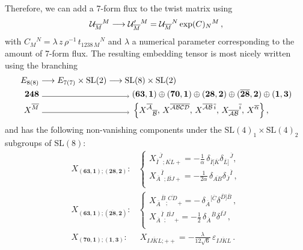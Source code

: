 \documentclass[a4paper, 11pt]{article}
\numberwithin{equation}{section}
\newcommand{\ov}[1]{\overline{#1}}
\newcommand{\SL}[1]{\mathrm{SL}( #1 )}
\newcommand{\EE}{\ensuremath{E_{8(8)}}\xspace}
\newcommand{\+}{\oplus}
\newcommand{\cU}{{\cal U}}
\newcommand{\fl}[1]{\ov{#1}}
\begin{document}
Therefore, we can add a 7-form flux to the twist matrix using
\begin{equation}
	\cU_{\fl{M}}{}^M \longrightarrow \cU'_{\fl{M}}{}^M = \cU_{\fl{M}}{}^N \exp(C)_N{}^M \,,
\end{equation}
with $C_M{}^N = \lambda\, z\,\rho^{-1}\, t_{1238\,M}{}^N$ and $\lambda$ a numerical parameter corresponding to the amount of 7-form flux. The resulting embedding tensor is most nicely written using the branching
\begin{equation} \label{eq:248decompoinSL8}
	\begin{aligned}
		\EE & \longrightarrow E_{7(7)}\times {\rm SL}(2) \longrightarrow {\rm SL}(8) \times {\rm SL}(2) \\
		\mathbf{248} & \ \tikz{\draw[arrows={->[scale=1.1]}] (0,0) -- (3.65
	,0);}\  (\mathbf{63},\mathbf{1}) \oplus (\mathbf{70},\mathbf{1}) \oplus (\mathbf{28},\mathbf{2}) \oplus (\mathbf{\fl{28}},\mathbf{2}) \oplus (\mathbf{1},\mathbf{3}) \\
		X^{\fl{M}} & \ \tikz{\draw[arrows={->[scale=1.1]}] (0,0) -- (3.65
	,0);}\ \left\{X^{\fl{\cal A}}{}_{\fl{\cal B}},\,X^{\fl{\cal ABCD}},\,X^{\fl{\cal AB}\,\fl{i}},\,X_{\fl{\cal AB}}{}^{\fl{i}},\,X^{\fl{\alpha}}\right\},
	\end{aligned}
\end{equation}
and has the following non-vanishing components under the $\SL{4}_1 \times \SL{4}_2$ subgroups of $\SL{8}$:
\begin{equation} \label{eq:embeddingtensor@origin}
	\begin{split}
		X_{(\mathbf{63},\mathbf{1});(\mathbf{28},\mathbf{2})}:&
		\begin{cases}
			\displaystyle X_{\fl{I}}{}^{\fl{J}}{}_{;\fl{KL}+}=-\frac{1}{\alpha}\,\delta_{\fl{I}[\fl{K}}\delta_{\fl{L}]}{}^{\fl{J}},\\[7pt]
			\displaystyle X_{\fl{A}}{}^{\fl{I}}{}_{;\fl{BJ}+}=-\frac{1}{2\alpha}\,\delta_{\fl{AB}}\delta_{\fl{J}}{}^{\fl{I}}\,,\\
		\end{cases} \\[5pt]
		X_{(\mathbf{63},\mathbf{1});(\mathbf{\fl{28}},\mathbf{2})}:&
		\begin{cases}
			\displaystyle X_{\fl{A}}{}^{\fl{B}}{}_{;}{}^{\fl{CD}}{}_{+}=-\,\delta_{\fl{A}}{}^{[\fl{C}}\delta^{\fl{D}]\fl{B}}\,,\\[7pt]
			\displaystyle X_{\fl{A}}{}^{\fl{I}}{}_{;}{}^{\fl{BJ}}{}_{+}=-\frac{1}{2}\,\delta_{\fl{A}}{}^{\fl{B}}\delta^{\fl{IJ}}\,,\\
		\end{cases} \\[5pt]
		X_{(\mathbf{70},\mathbf{1});(\mathbf{1},\mathbf{3})}:&\  X_{\fl{IJKL};++} = -\frac{\lambda}{12\sqrt{6}}\,\varepsilon_{\fl{IJKL}}\,.
	\end{split}
\end{equation}
\end{document}
